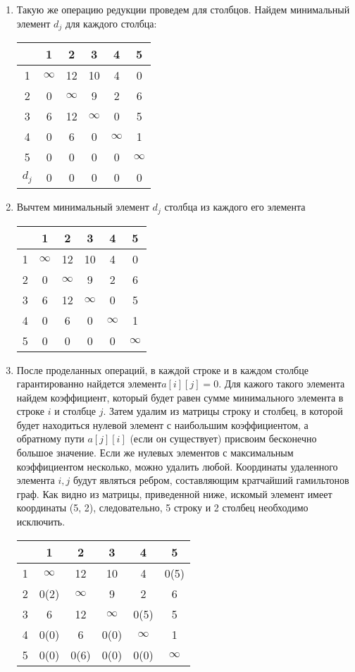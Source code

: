 \documentclass[a4paper, 12pt] {article}
\begin{document}
\begin{enumerate}
\item Такую же операцию редукции проведем для столбцов. Найдем минимальный элемент $d_{j}$ для каждого столбца:

\begin{tabular}{|c|c|c|c|c|c|}
\hline
& 1 & 2 & 3 & 4 & 5 \\
\hline
 1 & $\infty$ & 12 & 10 & 4 & 0 \\
\hline
2 & 0 & $\infty$ & 9 & 2 & 6 \\
\hline
3 & 6 & 12 & $\infty$ & 0 & 5 \\
\hline
4 & 0 & 6 & 0 & $\infty$ & 1 \\
\hline
5 & 0 & 0 & 0 & 0 & $\infty$ \\
\hline
$d_{j}$ & 0 & 0 & 0 & 0 & 0 \\
\hline
\end{tabular}


\item Вычтем минимальный элемент $d_{j}$ столбца из каждого его элемента

\begin{tabular}{|c|c|c|c|c|c|}
\hline
& 1 & 2 & 3 & 4 & 5 \\
\hline
 1 & $\infty$ & 12 & 10 & 4 & 0 \\
\hline
2 & 0 & $\infty$ & 9 & 2 & 6 \\
\hline
3 & 6 & 12 & $\infty$ & 0 & 5 \\
\hline
4 & 0 & 6 & 0 & $\infty$ & 1 \\
\hline
5 & 0 & 0 & 0 & 0 & $\infty$ \\
\hline
\end{tabular}

\item После проделанных операций, в каждой строке и в каждом столбце гарантированно найдется элемент$a[i][j] = 0$. Для кажого такого элемента найдем коэффициент, который будет равен сумме минимального элемента в строке $i$ и столбце $j$. Затем удалим из матрицы строку и столбец, в которой будет находиться нулевой элемент с наибольшим коэффициентом, а обратному пути $a[j][i]$ (если он существует) присвоим бесконечно большое значение. Если же нулевых элементов с максимальным коэффициентом несколько, можно удалить любой. Координаты удаленного элемента $i, j$ будут являться ребром, составляющим кратчайший гамильтонов граф. Как видно из матрицы, приведенной ниже, искомый элемент имеет координаты (5, 2), следовательно, 5 строку и 2 столбец необходимо исключить.

\begin{tabular}{|c|c|c|c|c|c|}
\hline
& 1 & 2 & 3 & 4 & 5 \\
\hline
 1 & $\infty$ & 12 & 10 & 4 & 0(5) \\
\hline
2 & 0(2) & $\infty$ & 9 & 2 & 6 \\
\hline
3 & 6 & 12 & $\infty$ & 0(5) & 5 \\
\hline
4 & 0(0) & 6 & 0(0) & $\infty$ & 1 \\
\hline
5 & 0(0) & 0(6) & 0(0) & 0(0) & $\infty$ \\
\hline
\end{tabular}


\end{enumerate}
\end{document}
